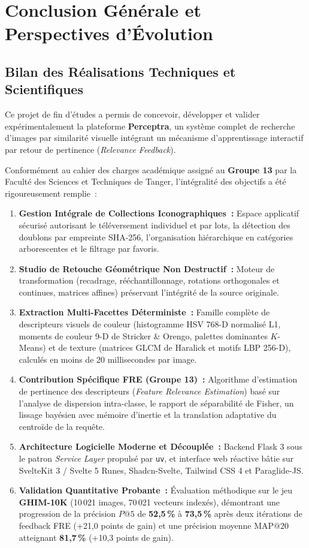 \chapter{Conclusion Générale et Perspectives d'Évolution}
\label{chap:conclusion}

\section{Bilan des Réalisations Techniques et Scientifiques}

Ce projet de fin d'études a permis de concevoir, développer et valider expérimentalement la plateforme \textbf{Perceptra}, un système complet de recherche d'images par similarité visuelle intégrant un mécanisme d'apprentissage interactif par retour de pertinence (\textit{Relevance Feedback}).

Conformément au cahier des charges académique assigné au \textbf{Groupe 13} par la Faculté des Sciences et Techniques de Tanger, l'intégralité des objectifs a été rigoureusement remplie~:
\begin{enumerate}
    \item \textbf{Gestion Intégrale de Collections Iconographiques~:} Espace applicatif sécurisé autorisant le téléversement individuel et par lots, la détection des doublons par empreinte SHA-256, l'organisation hiérarchique en catégories arborescentes et le filtrage par favoris.
    \item \textbf{Studio de Retouche Géométrique Non Destructif~:} Moteur de transformation (recadrage, rééchantillonnage, rotations orthogonales et continues, matrices affines) préservant l'intégrité de la source originale.
    \item \textbf{Extraction Multi-Facettes Déterministe~:} Famille complète de descripteurs visuels de couleur (histogramme HSV 768-D normalisé L1, moments de couleur 9-D de Stricker \& Orengo, palettes dominantes $K$-Means) et de texture (matrices GLCM de Haralick et motifs LBP 256-D), calculés en moins de 20 millisecondes par image.
    \item \textbf{Contribution Spécifique FRE (Groupe 13)~:} Algorithme d'estimation de pertinence des descripteurs (\textit{Feature Relevance Estimation}) basé sur l'analyse de dispersion intra-classe, le rapport de séparabilité de Fisher, un lissage bayésien avec mémoire d'inertie et la translation adaptative du centroïde de la requête.
    \item \textbf{Architecture Logicielle Moderne et Découplée~:} Backend Flask 3 sous le patron \textit{Service Layer} propulsé par \texttt{uv}, et interface web réactive bâtie sur SvelteKit 3 / Svelte 5 Runes, Shadcn-Svelte, Tailwind CSS 4 et Paraglide-JS.
    \item \textbf{Validation Quantitative Probante~:} Évaluation méthodique sur le jeu \textbf{GHIM-10K} (10\,021 images, 70\,021 vecteurs indexés), démontrant une progression de la précision $P@5$ de \textbf{52,5\,\%} à \textbf{73,5\,\%} après deux itérations de feedback FRE (+21,0 points de gain) et une précision moyenne $\text{MAP}@20$ atteignant \textbf{81,7\,\%} (+10,3 points de gain).
\end{enumerate}

